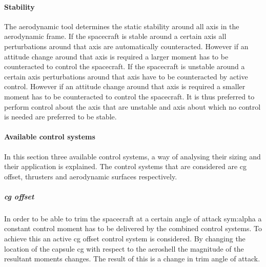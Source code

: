 \paragraph{Stability}
\label{control:stab}
The aerodynamic tool determines the static stability around all axis in the aerodynamic frame. If the spacecraft is stable around a certain axis all perturbations around that axis are automatically counteracted. However if an attitude change around that axis is required a larger moment has to be counteracted to control the spacecraft.  If the spacecraft is unstable around a certain axis perturbations around that axis have to be counteracted by active control. However if an attitude change around that axis is required a smaller moment has to be counteracted to control the spacecraft. It is thus preferred to perform control about the axis that are unstable and axis about which no control is needed are preferred to be stable.

\paragraph{Available control systems}
\label{control:system}
In this section three available control systems, a way of analysing their sizing and their application is explained. The control systems that are considered are \gls{cg} offset, thrusters and aerodynamic surfaces respectively.

\subparagraph{\acrlong{cg} offset}
In order to be able to trim the spacecraft at a certain angle of attack \gls{sym:alpha} a constant control moment has to be delivered by the combined control systems. To achieve this an active \gls{cg} offset control system is considered. By changing the location of the capsule \gls{cg} with respect to the aeroshell the magnitude of the resultant moments changes. The result of this is a change in trim angle of attack.


